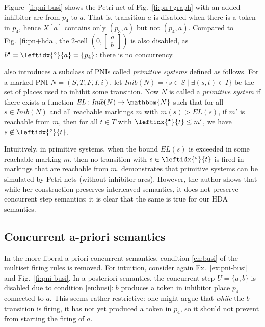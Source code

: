 \documentclass[runningheads,envcountsame]{llncs}
\newcommand*\Nat{\mathbbm{N}}
\newcommand*\loset[1]{\left[\begin{smallmatrix}#1\end{smallmatrix}\right]}
\newcommand*\prepla[1]{\leftidx{^\bullet}{#1}}
\newcommand*\pospla[1]{#1^\bullet}
\newcommand*\prepli[1]{\leftidx{^\circ}{#1}}
\newcommand*\Inib{\textit{Inib}}
\newcommand*\EL{\textit{EL}}
\begin{document}
\begin{example}
  \label{ex:pni-busi}
  Figure~\ref{fi:pni-busi} shows the Petri net of Fig.~\ref{fi:pn+graph}
  with an added inhibitor arc from $p_4$ to $a$.
  That is, transition $a$ is disabled when there is a token in $p_4$,
  hence $X[a]$ contains only $(p_3, a)$ but not $(p_4, a)$.
  Compared to Fig.~\ref{fi:pn+hda}, the $2$-cell $(0, \loset{a\\b})$ is also disabled,
  as $\pospla{b}=\prepli{a}=\{p_4\}$:
  there is no concurrency.
\end{example}

\cite{DBLP:journals/tcs/Busi02} also introduces a subclass of PNIs called \emph{primitive systems} defined as follows.
For a marked PNI $N=(S, T, F, I, i)$, let $\Inib(N)=\{ s\in S \mid \exists (s,t)\in I\}$ be the set of places used to inhibit some transition.
Now $N$ is called a \emph{primitive system} if there exists a function $\EL:\Inib(N)\to \Nat$ such that
for all $s\in \Inib(N)$ and all reachable markings $m$ with $m(s)>\EL(s)$,
if $m'$ is reachable from $m$, then
for all $t\in T$ with $\prepla{t}\le m'$,
we have $s \not\in \prepli{t}$.

Intuitively, in primitive systems, when the bound $\EL(s)$ is exceeded in some reachable marking $m$,
then no transition with $s\in \prepli{t}$ is fired in markings that are reachable from $m$.
\cite{DBLP:journals/tcs/Busi02} demonstrates that primitive systems can be simulated by Petri nets (without inhibitor arcs).
However, the author shows that while her construction preserves interleaved semantics, it does not preserve concurrent step semantics;
it is clear that the same is true for our HDA semantics.

\subsection{Concurrent a-priori semantics}

In the more liberal a-priori concurrent semantics, condition \ref{en:busi} of the multiset firing rules is removed.
For intuition, consider again Ex.~\ref{ex:pni-busi} and Fig.~\ref{fi:pni-busi}.
In a-posteriori semantics, the concurrent step $U=\{a,b\}$ is disabled due to condition \ref{en:busi}:
$b$ produces a token in inhibitor place $p_4$ connected to $a$.
This seems rather restrictive: one might argue that \emph{while} the $b$ transition is firing,
it has not yet produced a token in $p_4$,
so it should not prevent from starting the firing of $a$.
\end{document}
